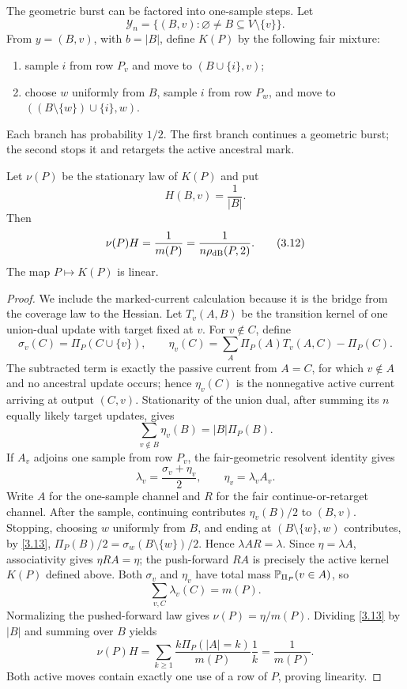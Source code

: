 The geometric burst can be factored into one-sample steps.  Let
\[
 \mathcal Y_n=\{(B,v):\varnothing\ne B\subseteq V\setminus\{v\}\}. \tag{3.10}\label{3.10}
\]
From $y=(B,v)$, with $b=|B|$, define $K(P)$ by the following fair mixture:
\begin{enumerate}
\item sample $i$ from row $P_v$ and move to $(B\cup\{i\},v)$;
\item choose $w$ uniformly from $B$, sample $i$ from row $P_w$, and move to
      $((B\setminus\{w\})\cup\{i\},w)$.
\end{enumerate}
Each branch has probability $1/2$.  The first branch continues a geometric
burst; the second stops it and retargets the active ancestral mark.

\begin{lemma}\label{lem:active}
Let $\nu(P)$ be the stationary law of $K(P)$ and put
\[
 H(B,v)=\frac1{|B|}.                                        \tag{3.11}\label{3.11}
\]
Then
\[
 \nu(P)H=\frac1{m(P)}=\frac1{n\rho_{\mathrm{dB}}(P,2)}.             \tag{3.12}\label{3.12}
\]
The map $P\mapsto K(P)$ is linear.
\end{lemma}

\begin{proof}
We include the marked-current calculation because it is the bridge from the
coverage law to the Hessian.  Let $T_v(A,B)$ be the transition kernel of one
union-dual update with target fixed at $v$.  For $v\notin C$, define
\[
 \sigma_v(C)=\Pi_P(C\cup\{v\}),\qquad
 \eta_v(C)=\sum_A\Pi_P(A)T_v(A,C)-\Pi_P(C).                 \tag{3.13a}\label{3.13a}
\]
The subtracted term is exactly the passive current from $A=C$, for which
$v\notin A$ and no ancestral update occurs; hence $\eta_v(C)$ is the
nonnegative active current arriving at output $(C,v)$.  Stationarity of the
union dual, after summing its $n$ equally likely target updates, gives
\[
 \sum_{v\notin B}\eta_v(B)=|B|\Pi_P(B).                    \tag{3.13}\label{3.13}
\]
If $A_v$ adjoins one sample from row $P_v$, the fair-geometric resolvent
identity gives
\[
 \lambda_v=\frac{\sigma_v+\eta_v}{2},\qquad
 \eta_v=\lambda_vA_v.                                      \tag{3.14}\label{3.14}
\]
Write $A$ for the one-sample channel and $R$ for the fair
continue-or-retarget channel.  After the sample, continuing contributes
$\eta_v(B)/2$ to $(B,v)$.  Stopping, choosing $w$ uniformly from $B$, and
ending at $(B\setminus\{w\},w)$ contributes, by \eqref{3.13},
$\Pi_P(B)/2=\sigma_w(B\setminus\{w\})/2$.  Hence
$\lambda AR=\lambda$.  Since $\eta=\lambda A$, associativity gives
$\eta RA=\eta$; the push-forward $RA$ is precisely the active kernel
$K(P)$ defined above.  Both $\sigma_v$ and $\eta_v$ have total mass
$\mathbb P_{\Pi_P}(v\in A)$, so
\[
 \sum_{v,C}\lambda_v(C)=m(P).                              \tag{3.15}\label{3.15}
\]
Normalizing the pushed-forward law gives $\nu(P)=\eta/m(P)$.  Dividing
\eqref{3.13} by $|B|$ and summing over $B$ yields
\[
 \nu(P)H=\sum_{k\ge1}\frac{k\Pi_P(|A|=k)}{m(P)}\frac1k
 =\frac1{m(P)}.                                             \tag{3.16}\label{3.16}
\]
Both active moves contain exactly one use of a row of $P$, proving linearity.
\end{proof}

